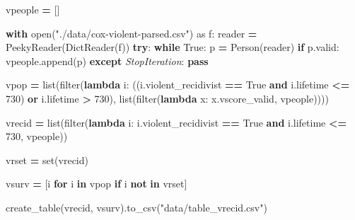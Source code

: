\documentclass[
]{book}
\newenvironment{Shaded}{\begin{snugshade}}{\end{snugshade}}
\newcommand{\BuiltInTok}[1]{#1}
\newcommand{\ControlFlowTok}[1]{\textcolor[rgb]{0.13,0.29,0.53}{\textbf{#1}}}
\newcommand{\DecValTok}[1]{\textcolor[rgb]{0.00,0.00,0.81}{#1}}
\newcommand{\ImportTok}[1]{#1}
\newcommand{\KeywordTok}[1]{\textcolor[rgb]{0.13,0.29,0.53}{\textbf{#1}}}
\newcommand{\NormalTok}[1]{#1}
\newcommand{\OperatorTok}[1]{\textcolor[rgb]{0.81,0.36,0.00}{\textbf{#1}}}
\newcommand{\PreprocessorTok}[1]{\textcolor[rgb]{0.56,0.35,0.01}{\textit{#1}}}
\newcommand{\StringTok}[1]{\textcolor[rgb]{0.31,0.60,0.02}{#1}}
\newcommand{\VariableTok}[1]{\textcolor[rgb]{0.00,0.00,0.00}{#1}}
\begin{document}
\begin{Shaded}
\begin{Highlighting}[]

\NormalTok{vpeople }\OperatorTok{=}\NormalTok{ []}

\ControlFlowTok{with} \BuiltInTok{open}\NormalTok{(}\StringTok{"./data/cox{-}violent{-}parsed.csv"}\NormalTok{) }\ImportTok{as}\NormalTok{ f:}
\NormalTok{    reader }\OperatorTok{=}\NormalTok{ PeekyReader(DictReader(f))}
    \ControlFlowTok{try}\NormalTok{:}
        \ControlFlowTok{while} \VariableTok{True}\NormalTok{:}
\NormalTok{            p }\OperatorTok{=}\NormalTok{ Person(reader)}
            \ControlFlowTok{if}\NormalTok{ p.valid:}
\NormalTok{                vpeople.append(p)}
    \ControlFlowTok{except} \PreprocessorTok{StopIteration}\NormalTok{:}
        \ControlFlowTok{pass}

\NormalTok{vpop }\OperatorTok{=} \BuiltInTok{list}\NormalTok{(}\BuiltInTok{filter}\NormalTok{(}\KeywordTok{lambda}\NormalTok{ i: ((i.violent\_recidivist }\OperatorTok{==} \VariableTok{True} \KeywordTok{and}\NormalTok{ i.lifetime }\OperatorTok{\textless{}=} \DecValTok{730}\NormalTok{) }\KeywordTok{or}
\NormalTok{                              i.lifetime }\OperatorTok{\textgreater{}} \DecValTok{730}\NormalTok{), }\BuiltInTok{list}\NormalTok{(}\BuiltInTok{filter}\NormalTok{(}\KeywordTok{lambda}\NormalTok{ x: x.vscore\_valid, vpeople))))}

\NormalTok{vrecid }\OperatorTok{=} \BuiltInTok{list}\NormalTok{(}\BuiltInTok{filter}\NormalTok{(}\KeywordTok{lambda}\NormalTok{ i: i.violent\_recidivist }\OperatorTok{==} \VariableTok{True} \KeywordTok{and}\NormalTok{ i.lifetime }\OperatorTok{\textless{}=} \DecValTok{730}\NormalTok{, vpeople))}

\NormalTok{vrset }\OperatorTok{=} \BuiltInTok{set}\NormalTok{(vrecid)}

\NormalTok{vsurv }\OperatorTok{=}\NormalTok{ [i }\ControlFlowTok{for}\NormalTok{ i }\KeywordTok{in}\NormalTok{ vpop }\ControlFlowTok{if}\NormalTok{ i }\KeywordTok{not} \KeywordTok{in}\NormalTok{ vrset]}
\end{Highlighting}
\end{Shaded}

\begin{Shaded}
\begin{Highlighting}[]

\NormalTok{create\_table(vrecid, vsurv).to\_csv(}\StringTok{"data/table\_vrecid.csv"}\NormalTok{)}
\end{Highlighting}
\end{Shaded}
\end{document}
